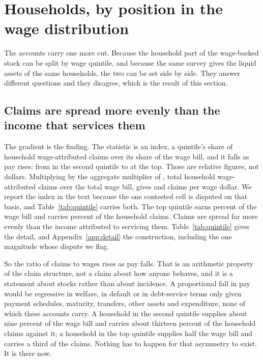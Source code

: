 \section{Households, by position in the wage distribution}
\label{sec:households}

The accounts carry one more cut. Because the household part of the wage-backed stock can be split
by wage quintile, and because the same survey gives the liquid assets of the same households, the
two can be set side by side. They answer different questions and they disagree, which is the
result of this section.

\subsection{Claims are spread more evenly than the income that services them}

The gradient is the finding. The statistic is an index, a quintile's share of household
wage-attributed claims over its share of the wage bill, and it falls as pay rises: from
 in the second quintile to  at the top. Those are relative
figures, not dollars. Multiplying by the aggregate multiplier of , total
household wage-attributed claims over the total wage bill, gives  and
 claims per wage dollar. We report the index in the text because the one contested
cell is disputed on that basis, and Table~\ref{tab:quintile} carries both. The top
quintile earns  percent of the wage bill and carries
 percent of the household claims. Claims are spread far more evenly than
the income attributed to servicing them. Table~\ref{tab:quintile} gives the detail, and
Appendix~\ref{app:detail} the construction, including the one magnitude whose dispute we flag.

So the ratio of claims to wages rises as pay falls. That is an arithmetic property of the claim
structure, not a claim about how anyone behaves, and it is a statement about stocks rather than
about incidence. A proportional fall in pay would be regressive in welfare, in default or in
debt-service terms only given payment schedules, maturity, transfers, other assets and
expenditure, none of which these accounts carry. A household in the second quintile supplies about nine percent of the wage bill and
carries about thirteen percent of the household claims against it; a household in the top
quintile supplies half the wage bill and carries a third of the claims. Nothing has to happen for
that asymmetry to exist. It is there now.

